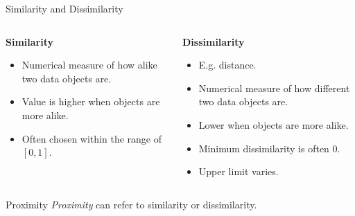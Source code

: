 \begin{frame}{Similarity and Dissimilarity}
  \begin{columns}
    \begin{column}{0.5\textwidth}
      \textbf{Similarity}
      \begin{itemize}
    \item Numerical measure of how alike two data objects are.
    \item Value is higher when objects are more alike.
    \item Often chosen within the range of $[0,1]$.
    \end{itemize}
    \end{column}
    \begin{column}{0.5\textwidth}
      \textbf{Dissimilarity}
          \begin{itemize}
    \item E.g. distance.
    \item Numerical measure of how different two data objects are.
    \item Lower when objects are more alike.
    \item Minimum dissimilarity is often $0$.
    \item Upper limit varies.
    \end{itemize}
    \end{column}
  \end{columns}

  \begin{alertblock}{Proximity}
    \textit{Proximity} can refer to similarity or dissimilarity.
  \end{alertblock}
\end{frame}

